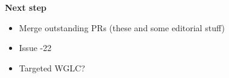 \documentclass[helvetica]{seminar}
\newcommand{\heading}[1]{%
  \begin{center} 
    \large\bf 
    #1 
  \end{center} 
  \vspace{.4 in}}
\begin{document}
\begin{slide}
\heading{Next step}

\begin{itemize}
\item Merge outstanding PRs (these and some editorial stuff)
\item Issue -22
\item Targeted WGLC?
\end{itemize}
\end{slide}
\end{document}
